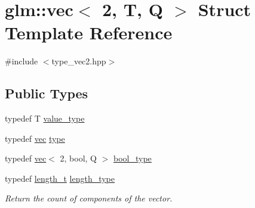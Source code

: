 \hypertarget{structglm_1_1vec_3_012_00_01_t_00_01_q_01_4}{}\section{glm\+:\+:vec$<$ 2, T, Q $>$ Struct Template Reference}
\label{structglm_1_1vec_3_012_00_01_t_00_01_q_01_4}


{\ttfamily \#include $<$type\+\_\+vec2.\+hpp$>$}

\subsection*{Public Types}
\begin{DoxyCompactItemize}
\item 
typedef T \hyperlink{structglm_1_1vec_3_012_00_01_t_00_01_q_01_4_ab44999b08d6a5e2c26e7708ada237759}{value\+\_\+type}
\item 
typedef \hyperlink{structglm_1_1vec}{vec} \hyperlink{structglm_1_1vec_3_012_00_01_t_00_01_q_01_4_a2734b4716ffba77d4ce4cc866cb31d3f}{type}
\item 
typedef \hyperlink{structglm_1_1vec}{vec}$<$ 2, bool, Q $>$ \hyperlink{structglm_1_1vec_3_012_00_01_t_00_01_q_01_4_a69145b83aafbff09d5d187089564c46f}{bool\+\_\+type}
\item 
typedef \hyperlink{namespaceglm_a090a0de2260835bee80e71a702492ed9}{length\+\_\+t} \hyperlink{structglm_1_1vec_3_012_00_01_t_00_01_q_01_4_af8b652526ec88c8513b2a8c05bf92441}{length\+\_\+type}
\begin{DoxyCompactList}\small\item\em Return the count of components of the vector. \end{DoxyCompactList}\end{DoxyCompactItemize}
